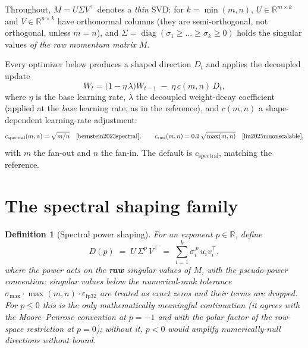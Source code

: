 \documentclass{article}
\newtheorem{definition}{Definition}
\DeclareMathOperator{\diag}{diag}
\begin{document}
Throughout, $M = U \Sigma V^\top$ denotes a \emph{thin} SVD: for
$k = \min(m,n)$, $U \in \mathbb{R}^{m\times k}$ and $V \in \mathbb{R}^{n\times k}$
have orthonormal columns (they are semi-orthogonal, not orthogonal, unless
$m=n$), and $\Sigma = \diag(\sigma_1 \ge \dots \ge \sigma_k \ge 0)$ holds the
singular values \emph{of the raw momentum matrix} $M$.

Every optimizer below produces a shaped direction $D_t$ and applies the
decoupled update
\begin{equation}
\label{eq:update}
W_t = \bigl(1 - \eta\,\lambda\bigr) W_{t-1} \;-\; \eta\,
c(m,n)\, D_t ,
\end{equation}
where $\eta$ is the base learning rate, $\lambda$ the decoupled weight-decay
coefficient (applied at the \emph{base} learning rate, as in the reference),
and $c(m,n)$ a shape-dependent learning-rate adjustment:
\begin{equation}
\label{eq:adjust}
c_{\mathrm{spectral}}(m,n) = \sqrt{m/n}
\quad\text{\cite{bernstein2023spectral}}, \qquad
c_{\mathrm{rms}}(m,n) = 0.2\,\sqrt{\max(m,n)}
\quad\text{\cite{liu2025muonscalable}},
\end{equation}
with $m$ the fan-out and $n$ the fan-in. The default is
$c_{\mathrm{spectral}}$, matching the reference.

\section{The spectral shaping family}

\begin{definition}[Spectral power shaping]
\label{def:dp}
For an exponent $p \in \mathbb{R}$, define
\begin{equation}
\label{eq:dp}
D(p) \;=\; U\, \Sigma^{p}\, V^\top
\;=\; \sum_{i=1}^{k} \sigma_i^{\,p}\, u_i v_i^\top ,
\end{equation}
where the power acts on the \textbf{raw} singular values of $M$, with the
\emph{pseudo-power} convention: singular values below the numerical-rank
tolerance $\sigma_{\max}\cdot\max(m,n)\cdot\varepsilon_{\mathrm{fp32}}$ are
treated as exact zeros and their terms are dropped. For $p \le 0$ this is the
only mathematically meaningful continuation (it agrees with the
Moore--Penrose convention at $p=-1$ and with the polar factor of the
row-space restriction at $p = 0$); without it, $p<0$ would amplify
numerically-null directions without bound.
\end{definition}
\end{document}
